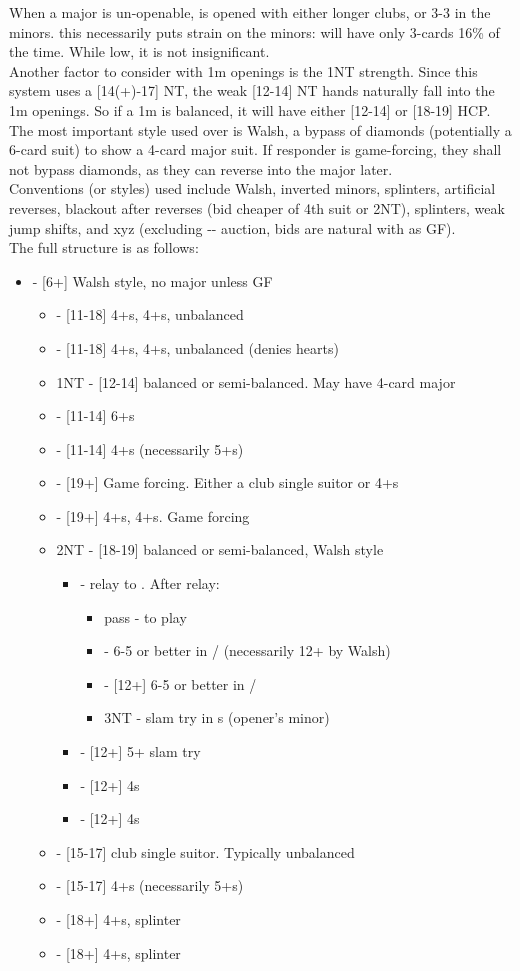\documentclass[12pt]{report}
\newcommand{\n}{\\}
\newcommand{\q}[1]{\multido{}{#1}{\qquad}}
\newcommand{\ul}[1]{\begin{itemize}#1\end{itemize}}
\newcommand{\li}[1]{\item[~] \q{#1}}
\begin{document}
\begin{center}

    When a major is un-openable,  is opened with either longer clubs, or 3-3 in the minors. this necessarily puts strain on the minors:  will have only 3-cards 16\% of the time.  While low, it is not insignificant.\n
    
    Another factor to consider with 1m openings is the 1NT strength.  Since this system uses a [14(+)-17] NT, the weak [12-14] NT hands naturally fall into the 1m openings.  So if a 1m is balanced, it will have either [12-14] or [18-19] HCP.\n

    The most important style used over  is Walsh, a bypass of diamonds (potentially a 6-card suit) to show a 4-card major suit.  If responder is game-forcing, they shall not bypass diamonds, as they can reverse into the major later.\n

    Conventions (or styles) used include Walsh, inverted minors, splinters, artificial reverses, blackout after reverses (bid cheaper of 4th suit or 2NT), splinters, weak jump shifts, and xyz (excluding -- auction, bids are natural with  as GF). \n

    The full structure is as follows:

    \ul {
        \li0  - [6+] Walsh style, no major unless GF
        \ul {
            \li0 \he1 - [11-18] 4+\cl{}s, 4+\he{}s, unbalanced
            \li0 \sp1 - [11-18] 4+\cl{}s, 4+\sp{}s, unbalanced (denies hearts)
            \li0 1NT - [12-14] balanced or semi-balanced.  May have 4-card major
            \li0 \cl2 - [11-14] 6+\cl{}s
            \li0 \di2 - [11-14] 4+\di{}s (necessarily 5+\cl{}s)
            \li0 \he2 - [19+] Game forcing.  Either a club single suitor or 4+\he{}s
            \li0 \sp2 - [19+] 4+\cl{}s, 4+\sp{}s.  Game forcing
            \li0 2NT - [18-19] balanced or semi-balanced, Walsh style
            \ul {
                \li0 \cl3 - relay to \di{3}.  After relay:
                \ul {
                    \li0 pass - to play
                    \li0 \he3 - 6-5 or better in \di{}/\he{} (necessarily 12+ by Walsh)
                    \li0 \sp3 - [12+] 6-5 or better in \di{}/\sp{}
                    \li0 3NT - slam try in \cl{}s (opener's minor)
                }
                \li0 \di3 - [12+] 5+ slam try
                \li0 \he3 - [12+] 4\he{}s
                \li0 \sp3 - [12+] 4\sp{}s
            }
            \li0 \cl3 - [15-17] club single suitor.  Typically unbalanced
            \li0 \di3 - [15-17] 4+\di{}s (necessarily 5+\cl{}s)
            \li0 \he3 - [18+] 4+\di{}s, splinter
            \li0 \sp3 - [18+] 4+\di{}s, splinter
        }

}
\end{center}
\end{document}
